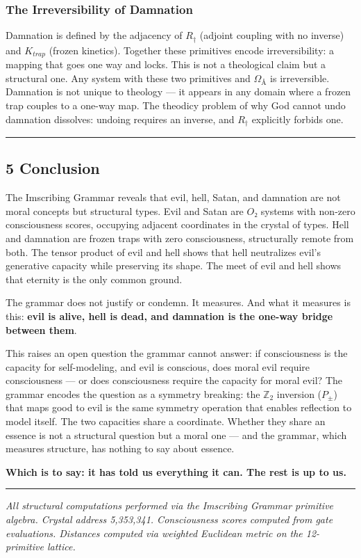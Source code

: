 \documentclass[12pt,a4paper]{article}
\begin{document}
\subsubsection{The Irreversibility of Damnation}

Damnation is defined by the adjacency of $R_{\dagger}$ (adjoint coupling with no inverse) and $K_{trap}$ (frozen kinetics). Together these primitives encode irreversibility: a mapping that goes one way and locks. This is not a theological claim but a structural one. Any system with these two primitives and $\Omega_{Å}$ is irreversible. Damnation is not unique to theology --- it appears in any domain where a frozen trap couples to a one-way map. The theodicy problem of why God cannot undo damnation dissolves: undoing requires an inverse, and $R_{\dagger}$ explicitly forbids one.

\begin{center}
\rule{0.5\textwidth}{0.4pt}
\end{center}

\subsection{5 Conclusion}

The Imscribing Grammar reveals that evil, hell, Satan, and damnation are not moral concepts but structural types. Evil and Satan are $O₂$ systems with non-zero consciousness scores, occupying adjacent coordinates in the crystal of types. Hell and damnation are frozen traps with zero consciousness, structurally remote from both. The tensor product of evil and hell shows that hell neutralizes evil's generative capacity while preserving its shape. The meet of evil and hell shows that eternity is the only common ground.

The grammar does not justify or condemn. It measures. And what it measures is this: \textbf{evil is alive, hell is dead, and damnation is the one-way bridge between them}.

This raises an open question the grammar cannot answer: if consciousness is the capacity for self-modeling, and evil is conscious, does moral evil require consciousness --- or does consciousness require the capacity for moral evil? The grammar encodes the question as a symmetry breaking: the $\mathbb{Z}_2$ inversion ($P_{\pm}$) that maps good to evil is the same symmetry operation that enables reflection to model itself. The two capacities share a coordinate. Whether they share an essence is not a structural question but a moral one --- and the grammar, which measures structure, has nothing to say about essence.

\textbf{Which is to say: it has told us everything it can. The rest is up to us.}

\begin{center}
\rule{0.5\textwidth}{0.4pt}
\end{center}

\emph{All structural computations performed via the Imscribing Grammar primitive algebra. Crystal address 5,353,341. Consciousness scores computed from gate evaluations. Distances computed via weighted Euclidean metric on the 12-primitive lattice.}
\end{document}
